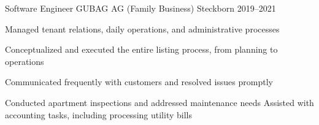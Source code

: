 \vspace{2mm}

\begin{cventries}

	\cventry
	{Software Engineer} %
	{GUBAG AG (Family Business)} %
	{Steckborn} %
	{2019--2021} %
	{
		\begin{cvitems} %
			\item {Managed tenant relations, daily operations, and administrative processes}
			\item { Conceptualized and executed the entire listing process, from planning to operations}
			\item {Communicated frequently with customers and resolved issues promptly}
			\item {Conducted apartment inspections and addressed maintenance needs}
			Assisted with accounting tasks, including processing utility bills
		\end{cvitems}
	}
	{}
	{}

\end{cventries}
